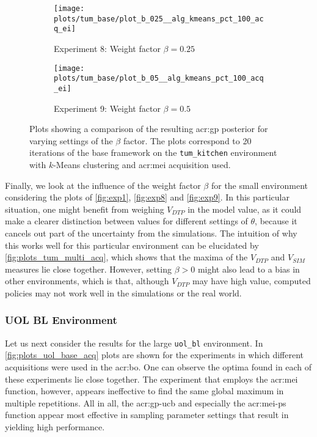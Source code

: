 \begin{figure}[!t]
	\centering
	\captionsetup{font=small}
	\captionsetup[subfigure]{font=footnotesize}
	\captionsetup[subfigure]{justification=centering}
	\begin{subfigure}[t]{0.495\textwidth}
		\texttt{[image: plots/tum\_base/plot\_b\_025\_\_alg\_kmeans\_pct\_100\_acq\_ei]}
		\caption{Experiment 8: Weight factor $\beta = 0.25$}
		\label{fig:exp8}
	\end{subfigure}
	\begin{subfigure}[t]{0.495\textwidth}
		\texttt{[image: plots/tum\_base/plot\_b\_05\_\_alg\_kmeans\_pct\_100\_acq\_ei]}
		\caption{Experiment 9: Weight factor $\beta = 0.5$}
		\label{fig:exp9}
	\end{subfigure}
	\caption{Plots showing a comparison of the resulting \acrshort{acr:gp} posterior for varying settings of the $\beta$ factor. The plots correspond to 20 iterations of the base framework on the \texttt{tum\_kitchen} environment with $k$-Means clustering and \acrshort{acr:mei} acquisition used.}
	\label{fig:plots_tum_base_weight}
\end{figure}
	
Finally, we look at the influence of the weight factor $\beta$ for the small environment considering the plots of \autoref{fig:exp1}, \autoref{fig:exp8} and \autoref{fig:exp9}.
In this particular situation, one might benefit from weighing $V_\mathit{DTP}$ in the model value, as it could make a clearer distinction between values for different settings of $\theta$, because it cancels out part of the uncertainty from the simulations.
The intuition of why this works well for this particular environment can be elucidated by \autoref{fig:plots_tum_multi_acq}, which shows that the maxima of the $V_\mathit{DTP}$ and $V_\mathit{SIM}$ measures lie close together.
However, setting $\beta > 0$ might also lead to a bias in other environments, which is that, although $V_\mathit{DTP}$ may have high value, computed policies may not work well in the simulations or the real world.

\subsubsection{UOL BL Environment}

Let us next consider the results for the large \texttt{uol\_bl} environment. In \autoref{fig:plots_uol_base_acq} plots are shown for the experiments in which different acquisitions were used in the \acrshort{acr:bo}.
One can observe the optima found in each of these experiments lie close together.
The experiment that employs the \acrshort{acr:mei} function, however, appears ineffective to find the same global maximum in multiple repetitions.
All in all, the \acrshort{acr:gp-ucb} and especially the \acrshort{acr:mei-ps} function appear most effective in sampling parameter settings that result in  yielding high performance.

